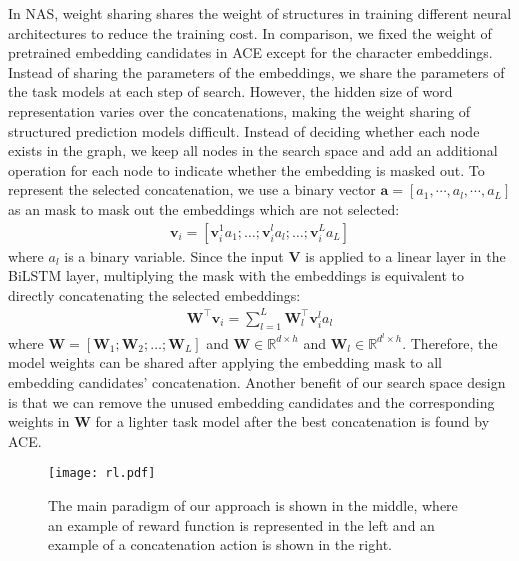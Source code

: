 \documentclass[11pt,a4paper]{article}
\def\va{{\bm{a}}}
\def\vv{{\bm{v}}}
\def\mV{{\bm{V}}}
\def\mW{{\bm{W}}}
\newcommand{\R}{\mathbb{R}}
\begin{document}
In NAS, weight sharing \citep{pmlr-v80-pham18a} shares the weight of structures in training different neural architectures to reduce the training cost. In comparison, we fixed the weight of pretrained embedding candidates in ACE except for the character embeddings. 
Instead of sharing the parameters of the embeddings, we share the parameters of the task models at each step of search.
However, the hidden size of word representation varies over the concatenations, making the weight sharing of structured prediction models difficult. Instead of deciding whether each node exists in the graph, we keep all nodes in the search space and add an additional operation for each node to indicate whether the embedding is masked out. To represent the selected concatenation, we use a binary vector $\va=[a_1, \cdots, a_l, \cdots, a_L]$ as an mask to mask out the embeddings which are not selected:
\begin{align}
\vv_i = [\vv_i^1a_1;\dots;\vv_i^la_l; \dots; \vv_i^La_L] \label{eq:vector}
\end{align}
where $a_l$ is a binary variable. Since the input $\mV$ is applied to a linear layer in the BiLSTM layer, multiplying the mask with the embeddings is equivalent to directly concatenating the selected embeddings:
\begin{align}
\mW^{\top}\vv_i = \sum_{l=1}^L \mW_l^{\top}\vv_i^l a_l \label{eq:linear}
\end{align}
where $\mW {=} [\mW_1;\mW_2;\dots ;\mW_L]$ and $\mW{\in} \R ^ {d \times h}$ and $\mW_l{\in} \R ^ {d^l \times h}$. Therefore, the model weights can be shared after applying the embedding mask to all embedding candidates' concatenation. Another benefit of our search space design is that we can remove the unused embedding candidates and the corresponding weights in $\mW$ for a lighter task model after the best concatenation is found by ACE.

\begin{figure*}
	\centering
	\texttt{[image: rl.pdf]}
	\caption{The main paradigm of our approach is shown in the middle, where an example of reward function is represented in the left and an example of a concatenation action is shown in the right.}
	\label{fig:architecture}
\end{figure*}
\end{document}
